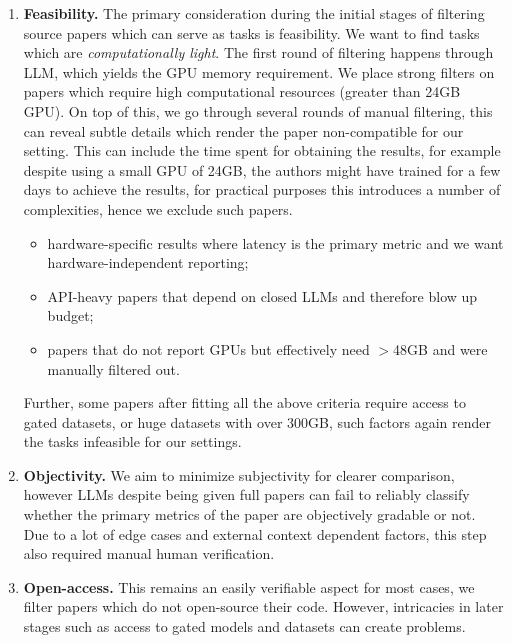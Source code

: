 \documentclass[11pt]{article}
\theoremstyle{plain}
\theoremstyle{definition}
\theoremstyle{remark}
\begin{document}
\begin{enumerate}[label=\textbf{P\arabic*:}, leftmargin=1.5em]

\item \textbf{Feasibility.}
The primary consideration during the initial stages of filtering source papers which can serve as tasks is feasibility. We want to find tasks which are \emph{computationally light}. The first round of filtering happens through LLM, which yields the GPU memory requirement. We place strong filters on papers which require high computational resources (greater than 24GB GPU). On top of this, we go through several rounds of manual filtering, this can reveal subtle details which render the paper non-compatible for our setting. This can include the time spent for obtaining the results, for example despite using a small GPU of 24GB, the authors might have trained for a few days to achieve the results, for practical purposes this introduces a number of complexities, hence we exclude such papers.

\begin{itemize}[leftmargin=1.2em, topsep=2pt, itemsep=1pt]
    \item hardware-specific results where latency is the primary metric and we want hardware-independent reporting;
    \item API-heavy papers that depend on closed LLMs and therefore blow up budget;
    \item papers that do not report GPUs but effectively need $>$48GB and were manually filtered out.
\end{itemize}

Further, some papers after fitting all the above criteria require access to gated datasets, or huge datasets with over 300GB, such factors again render the tasks infeasible for our settings.


\item \textbf{Objectivity.}
We aim to minimize subjectivity for clearer comparison, however LLMs despite being given full papers can fail to reliably classify whether the primary metrics of the paper are objectively gradable or not. Due to a lot of edge cases and external context dependent factors, this step also required manual human verification.

\item \textbf{Open-access.}
This remains an easily verifiable aspect for most cases, we filter papers which do not open-source their code. However, intricacies in later stages such as access to gated models and datasets can create problems.


\end{enumerate}
\end{document}
